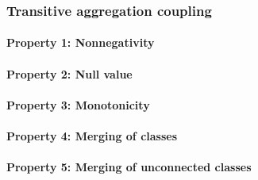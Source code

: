 \subsubsection{Transitive aggregation coupling}
\paragraph{Property 1: Nonnegativity}

\paragraph{Property 2: Null value}

\paragraph{Property 3: Monotonicity}

\paragraph{Property 4: Merging of classes}

\paragraph{Property 5: Merging of unconnected classes}

